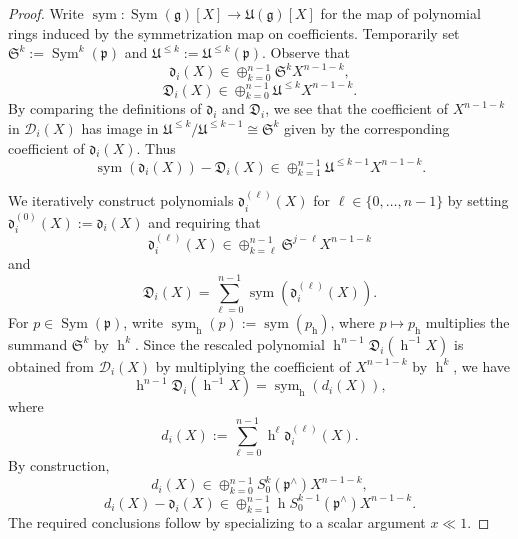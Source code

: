 \documentclass[reqno]{amsart}
\DeclareMathOperator{\h}{h}
\DeclareMathOperator{\Sym}{Sym}
\DeclareMathOperator{\gr}{gr}
\DeclareMathOperator{\sym}{sym}
\theoremstyle{plain} \newtheorem{theorem} {Theorem}
\theoremstyle{definition} \newtheorem{definition} [theorem] {Definition}
\theoremstyle{itplain} %
\numberwithin{equation}{section}
\numberwithin{theorem}{section}
\renewcommand{\leq}{\leqslant}
\begin{document}
\begin{proof}
  Write $\sym : \Sym(\mathfrak{g})[X] \rightarrow \mathfrak{U}(\mathfrak{g})[X]$ for the map of polynomial rings induced by the symmetrization map on coefficients.
  Temporarily set $\mathfrak{S}^k := \Sym^k(\mathfrak{p})$ and $\mathfrak{U}^{\leq k} := \mathfrak{U}^{\leq k}(\mathfrak{p})$.  Observe that
  \[
    \mathfrak{d}_i(X) \in \oplus_{k=0}^{n-1} \mathfrak{S}^k X^{n-1-k},
  \]
  \[
    \mathfrak{D}_i(X) \in \oplus_{k=0}^{n-1} \mathfrak{U}^{\leq k} X^{n-1-k}.
  \]
  By comparing the definitions of $\mathfrak{d}_i$ and $\mathfrak{D}_i$, we see that the coefficient of $X^{n-1-k}$ in $\mathcal{D}_i(X)$ has image in $\mathfrak{U}^{\leq k} / \mathfrak{U}^{\leq k-1} \cong \mathfrak{S}^k$ given by the corresponding coefficient of $\mathfrak{d}_i(X)$.  Thus
  \[
    \sym(\mathfrak{d}_i(X)) - \mathfrak{D}_i(X) \in \oplus _{k = 1}^{n-1} \mathfrak{U}^{\leq k-1} X^{n-1-k}.
  \]

  We iteratively construct polynomials $\mathfrak{d}_i^{(\ell)}(X)$ for $\ell \in \{0,\dotsc,n-1\}$ by setting $\mathfrak{d}_i^{(0)}(X) := \mathfrak{d}_i(X)$ and requiring that
  \[
    \mathfrak{d}_i^{(\ell)}(X) \in \oplus_{k=\ell}^{n-1} \mathfrak{S}^{j-\ell} X^{n-1-k}
  \]
  and
  \[
    \mathfrak{D}_i(X) = \sum _{\ell=0}^{n-1} \sym(\mathfrak{d}_i^{(\ell)}(X)).
  \]
  For $p \in \Sym(\mathfrak{p})$, write $\sym_{\h}(p) := \sym(p_{\h})$, where $p \mapsto p_{\h}$ multiplies the summand $\mathfrak{S}^k$ by $\h^k$.  Since the rescaled polynomial $\h^{n-1}\mathfrak{D}_i(\h^{-1} X)$ is obtained from $\mathcal{D}_i(X)$ by multiplying the coefficient of $X^{n-1-k}$ by $\h^k$, we have
  \[
    \h^{n-1} \mathfrak{D}_i(\h^{-1} X) = \sym_{\h}(d_i(X)),
  \]
  where
  \[
    d_i(X) := \sum _{\ell =0 }^{n-1} \h^{\ell} \mathfrak{d}_i^{(\ell)}(X).
  \]
  By construction,
  \[
    d_i(X) \in \oplus_{k=0}^{n-1} S_0^k(\mathfrak{p}^\wedge) X^{n-1-k},
  \]
  \[
    d_i(X) - \mathfrak{d}_i(X) \in \oplus_{k=1}^{n-1} \h S_0^{k-1}(\mathfrak{p}^\wedge) X^{n-1-k}.
  \]
  The required conclusions follow by specializing to a scalar argument $x \ll 1$.
\end{proof}
\end{document}

